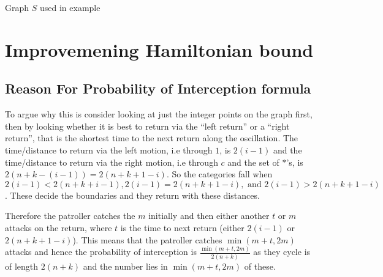 \documentclass[a4paper,10pt]{article}
\theoremstyle{definition}
\theoremstyle{definition}
\theoremstyle{remark}
\theoremstyle{definition}
\begin{document}
\begin{myfigure}
\begin{center}
\end{center}
\caption{Graph $S$ used in example}
\label{fig: S}
\end{myfigure}


\section{Improvemening Hamiltonian bound}

\subsection{Reason For Probability of Interception formula}
\label{appednixsection: Reason for probability of interception}
To argue why this is consider looking at just the integer points on the graph first,
then by looking whether it is best to return via the ``left return'' or a ``right return'', that is the shortest time to the next return along the oscillation. The time/distance to return via the left motion, i.e through $1$, is $2(i-1)$ and the time/distance to return via the right motion, i.e through $c$ and the set of $*$'s, is $2(n+k-(i-1))=2(n+k+1-i)$. So the categories fall when $2(i-1) < 2(n+k+i-1) , 2(i-1)=2(n+k+1-i) , \text{ and } 2(i-1) > 2(n+k+1-i)$. These decide the boundaries and they return with these distances.

Therefore the patroller catches the $m$ initially and then either another $t$ or $m$ attacks on the return, where $t$ is the time to next return (either $2(i-1)$ or $2(n+k+1-i)$). This means that the patroller catches $\min(m+t,2m)$ attacks and hence the probability of interception is $\frac{\min(m+t,2m)}{2(n+k)}$ as they cycle is of length $2(n+k)$ and the number lies in $\min(m+t,2m)$ of these.
\end{document}
